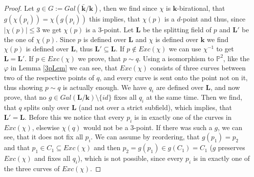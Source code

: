 \documentclass[12pt, oneside, reqno]{amsart}
\begin{document}
\begin{proof}
    Let $g \in G:= Gal(\bar{\textbf{k}}/\textbf{k})$, then we find since $\chi$ is $\textbf{k}$-birational, that $g(\chi(p_i)) = \chi(g(p_i))$ this implies, that $\chi(p)$ is a $d$-point and thus, since $|\chi(p)| \leq 3$ we get $\chi(p)$ is a $3$-point. Let $\textbf{L}$ be the splitting field of $p$ and $\textbf{L}'$ be the one of $\chi(p)$. Since $p$ is defined over $\textbf{L}$ and $\chi$ is defined over $\textbf{k}$ we find $\chi(p)$ is defined over $\textbf{L}$, thus $\textbf{L}' \subseteq \textbf{L}$. \newline 
    If $p \not\in Exc(\chi)$ we can use $\chi^{-1}$ to get $\textbf{L} = \textbf{L}'$. \newline
    If $p \in Exc(\chi)$ we prove, that $p \sim q$. Using a isomorphism to $\mathbb{P}^2$, like the $\varphi$ in Lemma \ref{3pLem} we can see, that $Exc(\chi)$ consists of three curves between two of the respective points of $q$, and every curve is sent onto the point not on it, thus showing $p \sim q$ is actually enough. We have $q_i$ are defined over $\textbf{L}$, and now prove, that no $g \in Gal(\textbf{L}/\textbf{k}) \setminus \{ id \}$ fixes all $q_i$ at the same time. Then we find, that $q$ splits only over $\textbf{L}$ (and not over a strict subfield), which implies, that $\textbf{L}' = \textbf{L}$. Before this we notice that every $p_i$ is in exactly one of the curves in $Exc(\chi)$, elsewise $\chi(q)$ would not be a $3$-point. If there was such a $g$, we can see, that it does not fix all $p_i$. We can assume by reordering, that $g(p_1) = p_2$ and that $p_1 \in C_1 \subseteq Exc(\chi)$ and then $p_2 = g(p_1) \in g(C_1) = C_1$ ($g$ preserves $Exc(\chi)$ and fixes all $q_i$), which is not possible, since every $p_i$ is in exactly one of the three curves of $Exc(\chi)$. 
\end{proof}
\end{document}
